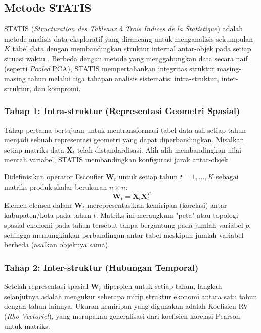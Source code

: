 \documentclass[a4paper]{article}
\theoremstyle{definition} %
\begin{document}
\subsection{Metode STATIS}

STATIS (\textit{Structuration des Tableaux à Trois Indices de la Statistique}) adalah metode analisis data eksploratif yang dirancang untuk menganalisis sekumpulan $K$ tabel data dengan membandingkan struktur internal antar-objek pada setiap situasi waktu \citep{lavit94}. Berbeda dengan metode yang menggabungkan data secara naif (seperti \textit{Pooled} PCA), STATIS mempertahankan integritas struktur masing-masing tahun melalui tiga tahapan analisis sistematis: intra-struktur, inter-struktur, dan kompromi.

\subsubsection{Tahap 1: Intra-struktur (Representasi Geometri Spasial)}
Tahap pertama bertujuan untuk mentransformasi tabel data asli setiap tahun menjadi sebuah representasi geometri yang dapat diperbandingkan. Misalkan setiap matriks data $\mathbf{X}_t$ telah distandardisasi. Alih-alih membandingkan nilai mentah variabel, STATIS membandingkan konfigurasi jarak antar-objek.

Didefinisikan operator Escoufier $\mathbf{W}_t$ untuk setiap tahun $t=1, \dots, K$ sebagai matriks produk skalar berukuran $n \times n$:
\begin{equation}
	\mathbf{W}_t = \mathbf{X}_t \mathbf{X}_t^T
\end{equation}
Elemen-elemen dalam $\mathbf{W}_t$ merepresentasikan kemiripan (korelasi) antar kabupaten/kota pada tahun $t$. Matriks ini merangkum "peta" atau topologi spasial ekonomi pada tahun tersebut tanpa bergantung pada jumlah variabel $p$, sehingga memungkinkan perbandingan antar-tabel meskipun jumlah variabel berbeda (asalkan objeknya sama).

\subsubsection{Tahap 2: Inter-struktur (Hubungan Temporal)}
Setelah representasi spasial $\mathbf{W}_t$ diperoleh untuk setiap tahun, langkah selanjutnya adalah mengukur seberapa mirip struktur ekonomi antara satu tahun dengan tahun lainnya. Ukuran kemiripan yang digunakan adalah Koefisien RV (\textit{Rho Vectoriel}), yang merupakan generalisasi dari koefisien korelasi Pearson untuk matriks.
\end{document}
